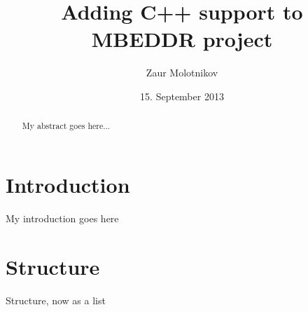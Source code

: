 \documentclass{article}
\title{Adding C++ support to MBEDDR project}
\author{Zaur Molotnikov}
\date{15. September 2013}
\begin{document}
\tumcoverpage
\tumtitlepage
\tumdeclrpage


\clearpage

\tableofcontents


\clearpage

\begin{abstract}
My abstract goes here...
\end{abstract}

\clearpage

\section{Introduction}
My introduction goes here

\section{Structure}

Structure, now as a list
\end{document}
